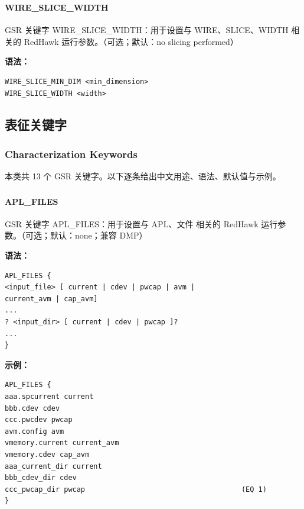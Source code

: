\subsubsection{}
\paragraph*{WIRE_SLICE_WIDTH}

GSR 关键字 WIRE_SLICE_WIDTH：用于设置与 WIRE、SLICE、WIDTH 相关的 RedHawk 运行参数。（可选；默认：no slicing performed）

\textbf{语法：}
\begin{lstlisting}
WIRE_SLICE_MIN_DIM <min_dimension>
WIRE_SLICE_WIDTH <width>
\end{lstlisting}

\subsection{表征关键字}
\subsubsection*{Characterization Keywords}

本类共 13 个 GSR 关键字。以下逐条给出中文用途、语法、默认值与示例。

\subsubsection{}
\paragraph*{APL_FILES}

GSR 关键字 APL_FILES：用于设置与 APL、文件 相关的 RedHawk 运行参数。（可选；默认：none；兼容 DMP）

\textbf{语法：}
\begin{lstlisting}
APL_FILES {
<input_file> [ current | cdev | pwcap | avm |
current_avm | cap_avm]
...
? <input_dir> [ current | cdev | pwcap ]?
...
}
\end{lstlisting}

\textbf{示例：}
\begin{lstlisting}
APL_FILES {
aaa.spcurrent current
bbb.cdev cdev
ccc.pwcdev pwcap
avm.config avm
vmemory.current current_avm
vmemory.cdev cap_avm
aaa_current_dir current
bbb_cdev_dir cdev
ccc_pwcap_dir pwcap                                     (EQ 1)
}
\end{lstlisting}

